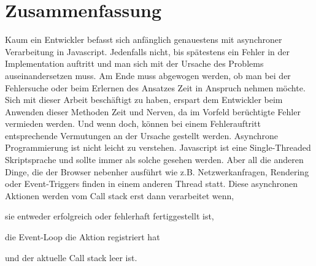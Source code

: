 \section{Zusammenfassung}

Kaum ein Entwickler befasst sich anfänglich genauestens mit asynchroner Verarbeitung in Javascript. Jedenfalls nicht, bis spätestens ein Fehler in der Implementation auftritt und man sich mit der Ursache des Problems auseinandersetzen muss. Am Ende muss abgewogen werden, ob man bei der Fehlersuche oder beim Erlernen des Ansatzes Zeit in Anspruch nehmen möchte. Sich mit dieser Arbeit beschäftigt zu haben, erspart dem Entwickler beim Anwenden dieser Methoden Zeit und Nerven, da im Vorfeld berüchtigte Fehler vermieden werden. Und wenn doch, können bei einem Fehlerauftritt entsprechende Vermutungen an der Ursache gestellt werden. Asynchrone Programmierung ist nicht leicht zu verstehen. Javascript ist eine Single-Threaded Skriptsprache und sollte immer als solche gesehen werden. Aber all die anderen Dinge, die der Browser nebenher ausführt wie z.B. Netzwerkanfragen, Rendering oder Event-Triggers finden in einem anderen Thread statt. Diese asynchronen Aktionen werden vom Call stack erst dann verarbeitet wenn, 

\begin{description}
\item sie entweder erfolgreich oder fehlerhaft fertiggestellt ist,
\item die Event-Loop die Aktion registriert hat
\item und der aktuelle Call stack leer ist.
\end{description}

